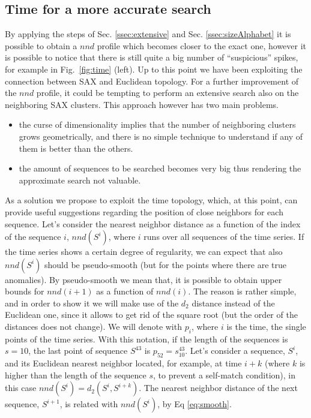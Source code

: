 \documentclass[a4paper,twoside]{article}
\begin{document}
\subsection{Time for a more accurate search}\label{ssec:time} 
By applying the steps of Sec. \ref{ssec:extensive} and Sec. \ref{ssec:sizeAlphabet} it is possible to obtain a $nnd$ profile which becomes  closer to the exact one, however it is possible to notice that there is still quite a big number of ``suspicious'' spikes, for example in Fig.~\ref{fig:time} (left).
Up to this point we have been exploiting the connection between SAX and Euclidean topology. For a further improvement of the $nnd$ profile,  it could be tempting to perform an extensive search also on the neighboring SAX clusters. This approach however has two main problems.
\begin{itemize}
 \item the curse of dimensionality implies that the number of neighboring clusters grows geometrically, and there is no simple technique to understand if any of them is better than the others.
 \item the amount of sequences to be searched becomes very big thus rendering the approximate search not valuable.
\end{itemize}
As a solution we propose to exploit the time topology, which, at this point, can provide useful suggestions regarding the position of close neighbors for each sequence. 
%
Let's consider the nearest neighbor distance as a function of the index of the sequence $i$, $nnd(S^i)$, where $i$ runs over all sequences of the time series.
%
If the time series shows a certain degree of regularity, we can expect that also $nnd(S^i)$ should be pseudo-smooth (but for the points where there are true anomalies). By pseudo-smooth we mean that, it is possible to obtain upper bounds for $nnd(i+1)$ as a function of $nnd(i)$.
The reason is rather simple, and in order to show it we will make use of the $d_2$ distance instead of the Euclidean one, since it allows to get rid of the square root (but the order of the distances does not change).
%
We will denote with $p_i$, where $i$ is the time, the single points of the time series. With this notation, if the length of the sequences is $s=10$, the last point of sequence $S^{43}$ is $p_{52}=s^{43}_{10}$.  
Let's consider a sequence, $S^i$, and its Euclidean nearest neighbor located, for example, at time $i+k$ (where $k$ is higher than the length of the sequence $s$, to prevent a self-match condition), in this case
 $nnd(S^i)=d_2(S^i, S^{i+k})$. The nearest neighbor distance of the next sequence, $S^{i+1}$, is related with $nnd(S^i)$, by Eq \ref{eq:smooth}.  
\end{document}
